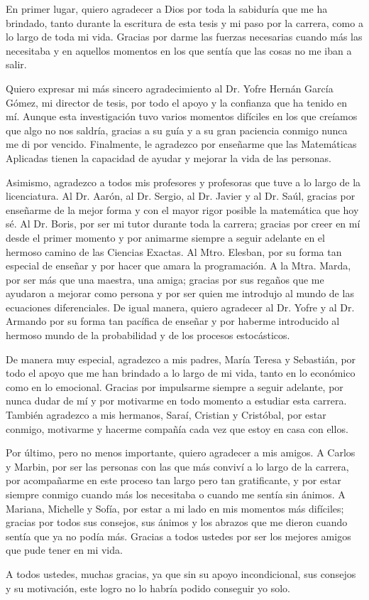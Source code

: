 En primer lugar, quiero agradecer a Dios por toda la sabiduría que me ha brindado, tanto durante la escritura de esta tesis y mi paso por la carrera, como a lo largo de toda mi vida. Gracias por darme las fuerzas necesarias cuando más las necesitaba y en aquellos momentos en los que sentía que las cosas no me iban a salir.

Quiero expresar mi más sincero agradecimiento al Dr. Yofre Hernán García Gómez, mi director de tesis, por todo el apoyo y la confianza que ha tenido en mí. Aunque esta investigación tuvo varios momentos difíciles en los que creíamos que algo no nos saldría, gracias a su guía y a su gran paciencia conmigo nunca me di por vencido. Finalmente, le agradezco por enseñarme que las Matemáticas Aplicadas tienen la capacidad de ayudar y mejorar la vida de las personas.

Asimismo, agradezco a todos mis profesores y profesoras que tuve a lo largo de la licenciatura. Al Dr. Aarón, al Dr. Sergio, al Dr. Javier y al Dr. Saúl, gracias por enseñarme de la mejor forma y con el mayor rigor posible la matemática que hoy sé. Al Dr. Boris, por ser mi tutor durante toda la carrera; gracias por creer en mí desde el primer momento y por animarme siempre a seguir adelante en el hermoso camino de las Ciencias Exactas. Al Mtro. Elesban, por su forma tan especial de enseñar y por hacer que amara la programación. A la Mtra. Marda, por ser más que una maestra, una amiga; gracias por sus regaños que me ayudaron a mejorar como persona y por ser quien me introdujo al mundo de las ecuaciones diferenciales. De igual manera, quiero agradecer al Dr. Yofre y al Dr. Armando por su forma tan pacífica de enseñar y por haberme introducido al hermoso mundo de la probabilidad y de los procesos estocásticos.

De manera muy especial, agradezco a mis padres, María Teresa y Sebastián, por todo el apoyo que me han brindado a lo largo de mi vida, tanto en lo económico como en lo emocional. Gracias por impulsarme siempre a seguir adelante, por nunca dudar de mí y por motivarme en todo momento a estudiar esta carrera. También agradezco a mis hermanos, Saraí, Cristian y Cristóbal, por estar conmigo, motivarme y hacerme compañía cada vez que estoy en casa con ellos.

Por último, pero no menos importante, quiero agradecer a mis amigos. A Carlos y Marbin, por ser las personas con las que más conviví a lo largo de la carrera, por acompañarme en este proceso tan largo pero tan gratificante, y por estar siempre conmigo cuando más los necesitaba o cuando me sentía sin ánimos. A Mariana, Michelle y Sofía, por estar a mi lado en mis momentos más difíciles; gracias por todos sus consejos, sus ánimos y los abrazos que me dieron cuando sentía que ya no podía más. Gracias a todos ustedes por ser los mejores amigos que pude tener en mi vida.

A todos ustedes, muchas gracias, ya que sin su apoyo incondicional, sus consejos y su motivación, este logro no lo habría podido conseguir yo solo.